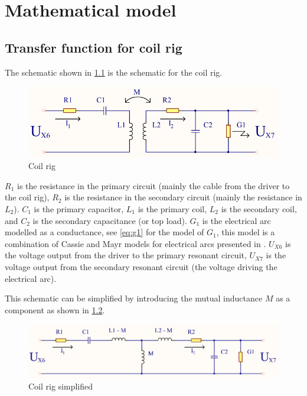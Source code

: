 \chapter{Mathematical model}
\label{sec:math}


\section{Transfer function for coil rig}
\label{sec:coilrigmath}

The schematic shown in \cref{fig:spolerigg11} is the schematic for the coil rig.

\begin{figure}[H]
    \centering
    \includegraphics[width=\textwidth]{Skjema/Spolerigg1_r.pdf}
    \caption{Coil rig}
    \label{fig:spolerigg11}
\end{figure}

$R_1$ is the resistance in the primary circuit (mainly the cable from the driver to the coil rig), $R_2$ is the resistance in the secondary circuit (mainly the resistance in $L_2$). $C_1$ is the primary capacitor, $L_1$ is the primary coil, $L_2$ is the secondary coil, and $C_2$ is the secondary capacitance (or top load). $G_1$ is the electrical arc modelled as a conductance, see \cref{eq:g1} for the model of $G_1$, this model is a combination of Cassie \citep{cassie} and Mayr \citep{mayr} models for electrical arcs presented in \citep{575670}. $U_{X6}$ is the voltage output from the driver to the primary resonant circuit, $U_{X7}$ is the voltage output from the secondary resonant circuit (the voltage driving the electrical arc).

This schematic can be simplified by introducing the mutual inductance $M$ as a component as shown in \cref{fig:spolerigg2}.

\begin{figure}[H]
    \centering
    \includegraphics[width=\textwidth]{Skjema/Spolerigg2_r.pdf}
    \caption{Coil rig simplified}
    \label{fig:spolerigg2}
\end{figure}

